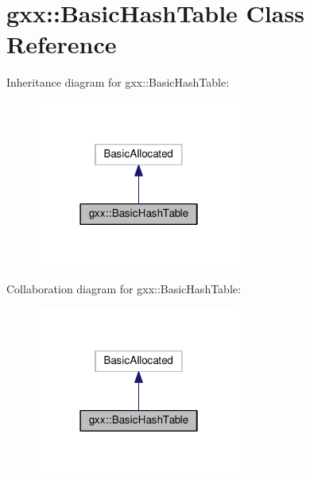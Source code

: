 \hypertarget{classgxx_1_1BasicHashTable}{}\section{gxx\+:\+:Basic\+Hash\+Table Class Reference}
\label{classgxx_1_1BasicHashTable}


Inheritance diagram for gxx\+:\+:Basic\+Hash\+Table\+:
\nopagebreak
\begin{figure}[H]
\begin{center}
\leavevmode
\includegraphics[width=190pt]{classgxx_1_1BasicHashTable__inherit__graph}
\end{center}
\end{figure}


Collaboration diagram for gxx\+:\+:Basic\+Hash\+Table\+:
\nopagebreak
\begin{figure}[H]
\begin{center}
\leavevmode
\includegraphics[width=190pt]{classgxx_1_1BasicHashTable__coll__graph}
\end{center}
\end{figure}
